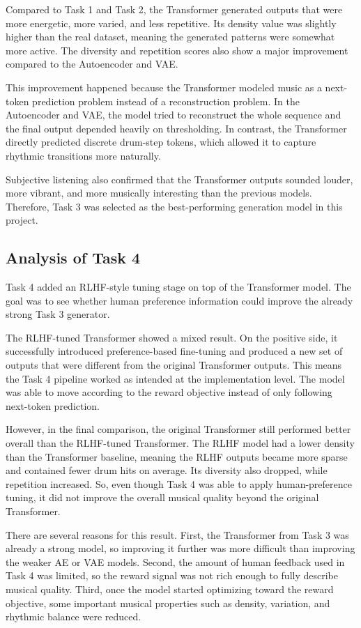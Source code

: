 \documentclass[conference]{IEEEtran}
\begin{document}
Compared to Task 1 and Task 2, the Transformer generated outputs that were more energetic, more varied, and less repetitive. Its density value was slightly higher than the real dataset, meaning the generated patterns were somewhat more active. The diversity and repetition scores also show a major improvement compared to the Autoencoder and VAE.

This improvement happened because the Transformer modeled music as a next-token prediction problem instead of a reconstruction problem. In the Autoencoder and VAE, the model tried to reconstruct the whole sequence and the final output depended heavily on thresholding. In contrast, the Transformer directly predicted discrete drum-step tokens, which allowed it to capture rhythmic transitions more naturally.

Subjective listening also confirmed that the Transformer outputs sounded louder, more vibrant, and more musically interesting than the previous models. Therefore, Task 3 was selected as the best-performing generation model in this project.

\subsection{Analysis of Task 4}
Task 4 added an RLHF-style tuning stage on top of the Transformer model. The goal was to see whether human preference information could improve the already strong Task 3 generator.

The RLHF-tuned Transformer showed a mixed result. On the positive side, it successfully introduced preference-based fine-tuning and produced a new set of outputs that were different from the original Transformer outputs. This means the Task 4 pipeline worked as intended at the implementation level. The model was able to move according to the reward objective instead of only following next-token prediction.

However, in the final comparison, the original Transformer still performed better overall than the RLHF-tuned Transformer. The RLHF model had a lower density than the Transformer baseline, meaning the RLHF outputs became more sparse and contained fewer drum hits on average. Its diversity also dropped, while repetition increased. So, even though Task 4 was able to apply human-preference tuning, it did not improve the overall musical quality beyond the original Transformer.

There are several reasons for this result. First, the Transformer from Task 3 was already a strong model, so improving it further was more difficult than improving the weaker AE or VAE models. Second, the amount of human feedback used in Task 4 was limited, so the reward signal was not rich enough to fully describe musical quality. Third, once the model started optimizing toward the reward objective, some important musical properties such as density, variation, and rhythmic balance were reduced.
\end{document}
